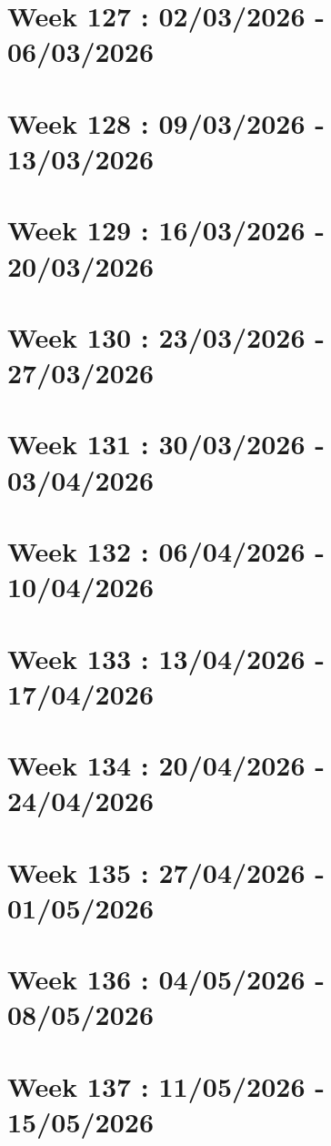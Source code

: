 \documentclass[french]{article}
\begin{document}
	\section{Week 127 : 02/03/2026 - 06/03/2026}

	\section{Week 128 : 09/03/2026 - 13/03/2026}

	\section{Week 129 : 16/03/2026 - 20/03/2026}

	\section{Week 130 : 23/03/2026 - 27/03/2026}

	\section{Week 131 : 30/03/2026 - 03/04/2026}

	\section{Week 132 : 06/04/2026 - 10/04/2026}

	\section{Week 133 : 13/04/2026 - 17/04/2026}

	\section{Week 134 : 20/04/2026 - 24/04/2026}

	\section{Week 135 : 27/04/2026 - 01/05/2026}

	\section{Week 136 : 04/05/2026 - 08/05/2026}

	\section{Week 137 : 11/05/2026 - 15/05/2026}
\end{document}
